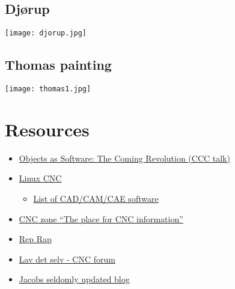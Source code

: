 \documentclass[11pt]{beamer}
\begin{document}
\subsection*{Djørup}\begin{frame}[fragile]
\label{sec-6.10}

\texttt{[image: djorup.jpg]}

\end{frame}
\subsection*{Thomas painting}\begin{frame}[fragile]
\label{sec-6.11}

\texttt{[image: thomas1.jpg]}


\end{frame}
\section{Resources}
\label{sec-7}

\begin{itemize}
\item \href{http://media.ccc.de/browse/congress/2008/25c3-2781-en-objects_as_software_the_coming_revolution.html}{Objects as Software: The Coming Revolution (CCC talk)}
\item \href{http://www.linuxcnc.org/}{Linux CNC}

\begin{itemize}
\item \href{http://wiki.linuxcnc.org/cgi-bin/emcinfo.pl%3FCam}{List of CAD/CAM/CAE software}
\end{itemize}

\item \href{http://www.cnczone.com}{CNC zone ``The place for CNC information''}
\item \href{http://reprap.org}{Rep Rap}
\item \href{http://www.lav-det-selv.dk/Forum/afv/topicsview/aff/36/}{Lav det selv - CNC forum}
\item \href{http://rotand.dk/blog}{Jacobs seldomly updated blog}
\end{itemize}
\end{document}
